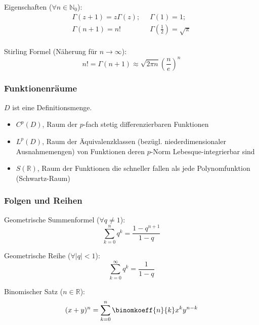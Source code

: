 \documentclass[11pt]{article}
\numberwithin{equation}{section}
\begin{document}
    			Eigenschaften ($\forall n\in\mathbb{N}_0$):
    			\begin{equation}
      			\begin{array}{cc}
      				\Gamma(z+1)=z\Gamma(z);
      				&\;\; \Gamma\left(1 \right)=1; \\
      				\Gamma(n+1) = n!
      				&\;\; \Gamma\left(\frac{1}{2} \right)=\sqrt{\pi} \\
      			\end{array}
    			\end{equation}

          Stirling Formel (Näherung für $n\rightarrow\infty$):
          \begin{equation}
            n! = \Gamma(n+1) \approx \sqrt{2\pi n} \left( \frac{n}{e} \right)^{n}
          \end{equation}


      \subsubsection{Funktionenräume}
        $D$ ist eine Definitionsmenge.
        \begin{itemize}
          \item $C^p(D)$, Raum der $p$-fach stetig differenzierbaren Funktionen
          \item $L^p(D)$, Raum der Äquivalenzklassen (bezügl. niederdimensionaler Ausnahmemengen) von Funktionen deren $p$-Norm Lebesque-integrierbar sind
          \item $S(\mathbb{R})$, Raum der Funktionen die schneller fallen als jede Polynomfunktion (Schwartz-Raum)
        \end{itemize}

      \subsubsection{Folgen und Reihen}
          Geometrische Summenformel ($\forall q \ne 1$):
          \begin{equation}
            \sum_{k=0}^n q^k=\frac{1-q^{n+1}}{1-q}
          \end{equation}

          Geometrische Reihe ($\forall \left|q\right| < 1$):
          \begin{equation}
            \sum_{k=0}^\infty q^k= \frac{1}{1-q}
          \end{equation}

          Binomischer Satz ($n\in\mathbb{R}$):
          \begin{equation}
            (x+y)^n=\sum_{k=0}^{n}\binomkoeff{n}{k}x^k y^{n-k}
          \end{equation}
\end{document}
